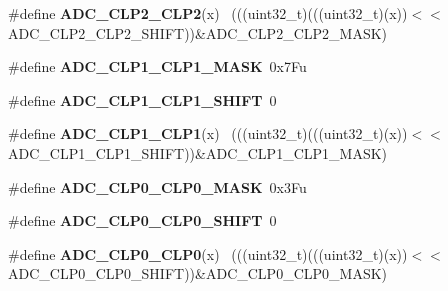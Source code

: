 \begin{DoxyCompactItemize}
\item 
\hypertarget{group___a_d_c___register___masks_gac6511aa3238e7d5eb858c3dfbd0068b5}{}\#define {\bfseries A\+D\+C\+\_\+\+C\+L\+P2\+\_\+\+C\+L\+P2}(x)                                              ~(((uint32\+\_\+t)(((uint32\+\_\+t)(x))$<$$<$A\+D\+C\+\_\+\+C\+L\+P2\+\_\+\+C\+L\+P2\+\_\+\+S\+H\+I\+F\+T))\&A\+D\+C\+\_\+\+C\+L\+P2\+\_\+\+C\+L\+P2\+\_\+\+M\+A\+S\+K)\label{group___a_d_c___register___masks_gac6511aa3238e7d5eb858c3dfbd0068b5}

\item 
\hypertarget{group___a_d_c___register___masks_ga597fddbb6d859ea54a49dd4a1eea72fb}{}\#define {\bfseries A\+D\+C\+\_\+\+C\+L\+P1\+\_\+\+C\+L\+P1\+\_\+\+M\+A\+S\+K}~0x7\+Fu\label{group___a_d_c___register___masks_ga597fddbb6d859ea54a49dd4a1eea72fb}

\item 
\hypertarget{group___a_d_c___register___masks_gab34e145666bb569d17f381665d6f5156}{}\#define {\bfseries A\+D\+C\+\_\+\+C\+L\+P1\+\_\+\+C\+L\+P1\+\_\+\+S\+H\+I\+F\+T}~0\label{group___a_d_c___register___masks_gab34e145666bb569d17f381665d6f5156}

\item 
\hypertarget{group___a_d_c___register___masks_ga214e6735f8151ad43f51f86364386036}{}\#define {\bfseries A\+D\+C\+\_\+\+C\+L\+P1\+\_\+\+C\+L\+P1}(x)                                              ~(((uint32\+\_\+t)(((uint32\+\_\+t)(x))$<$$<$A\+D\+C\+\_\+\+C\+L\+P1\+\_\+\+C\+L\+P1\+\_\+\+S\+H\+I\+F\+T))\&A\+D\+C\+\_\+\+C\+L\+P1\+\_\+\+C\+L\+P1\+\_\+\+M\+A\+S\+K)\label{group___a_d_c___register___masks_ga214e6735f8151ad43f51f86364386036}

\item 
\hypertarget{group___a_d_c___register___masks_ga7a8099e7e4fcb450308767ab0df8e458}{}\#define {\bfseries A\+D\+C\+\_\+\+C\+L\+P0\+\_\+\+C\+L\+P0\+\_\+\+M\+A\+S\+K}~0x3\+Fu\label{group___a_d_c___register___masks_ga7a8099e7e4fcb450308767ab0df8e458}

\item 
\hypertarget{group___a_d_c___register___masks_gad3035c445e10948c653ac0a028008109}{}\#define {\bfseries A\+D\+C\+\_\+\+C\+L\+P0\+\_\+\+C\+L\+P0\+\_\+\+S\+H\+I\+F\+T}~0\label{group___a_d_c___register___masks_gad3035c445e10948c653ac0a028008109}

\item 
\hypertarget{group___a_d_c___register___masks_ga4474d62a7ce00adb7467954027539676}{}\#define {\bfseries A\+D\+C\+\_\+\+C\+L\+P0\+\_\+\+C\+L\+P0}(x)                                              ~(((uint32\+\_\+t)(((uint32\+\_\+t)(x))$<$$<$A\+D\+C\+\_\+\+C\+L\+P0\+\_\+\+C\+L\+P0\+\_\+\+S\+H\+I\+F\+T))\&A\+D\+C\+\_\+\+C\+L\+P0\+\_\+\+C\+L\+P0\+\_\+\+M\+A\+S\+K)\label{group___a_d_c___register___masks_ga4474d62a7ce00adb7467954027539676}


\end{DoxyCompactItemize}
